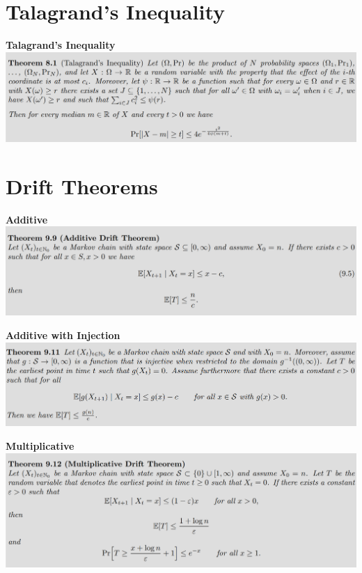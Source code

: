 \documentclass[25pt]{sciposter}
\begin{document}
\begin{multicols}{3}
\section{Talagrand's Inequality}
\textbf{Talagrand's Inequality}\\
\includegraphics[width=\linewidth]{screenshot005.png}



\section{Drift Theorems}
\textbf{Additive}\\
\includegraphics[width=\linewidth]{screenshot006}

\textbf{Additive with Injection}\\
\includegraphics[width=\linewidth]{screenshot008}

\textbf{Multiplicative}\\
\includegraphics[width=\linewidth]{screenshot009}


\end{multicols}
\end{document}
